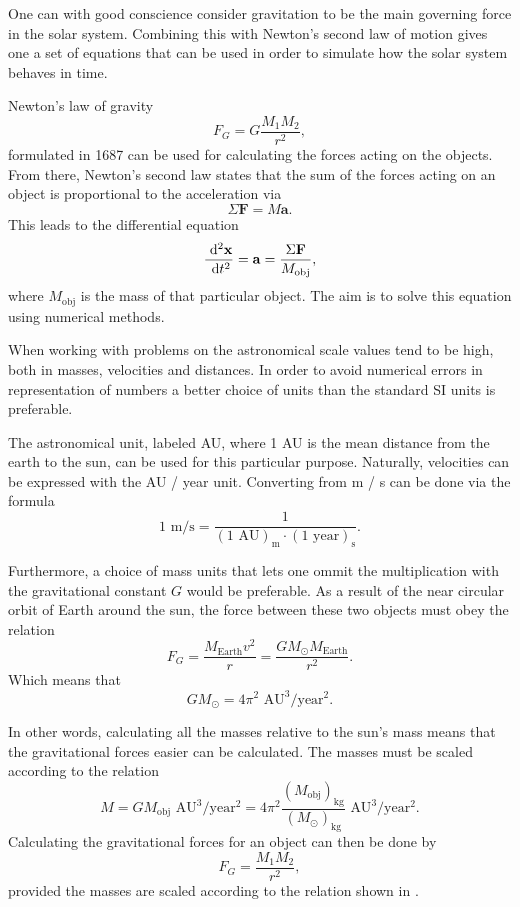 One can with good conscience consider gravitation to be the main
governing force in the solar system. Combining this with Newton's
second law of motion gives one a set of equations that can be used
in order to simulate how the solar system behaves in time.

Newton's law of gravity \[ F_G = G\frac{M_1 M_2}{r^2}, \]
formulated in 1687 can be used for calculating the forces acting on
the objects. From there, Newton's second law states that the sum of
the forces acting on an object is proportional to the acceleration
via \[ \Sigma \mathbf{F} = M \mathbf{a}. \] This leads to the
differential equation \[ \frac{\ \mathrm{d}^2 \mathbf{x}}{\ \mathrm{d}t^2} =
\mathbf{a} = \frac{\Sigma \mathbf{F}}{M_{\text{obj}}}, \] where
$M_{\text{obj}}$ is the mass of that particular object. The aim is
to solve this equation using numerical methods.

When working with problems on the astronomical scale values tend to
be high, both in masses, velocities and distances. In order to
avoid numerical errors in representation of numbers a better choice
of units than the standard SI units is preferable.

The astronomical unit, labeled AU, where 1 AU is the mean distance
from the earth to the sun, can be used for this particular purpose.
Naturally, velocities can be expressed with the AU / year unit.
Converting from m / s can be done via the formula \[1 \text{ m/s} =
\frac{1}{(1 \text{ AU})_{\text{m}} \cdot (1 \text{ year})_{\text{s}}}. \]

Furthermore, a choice of mass units that lets one ommit the
multiplication with the gravitational constant $G$ would be
preferable. As a result of the near circular orbit of Earth around
the sun, the force between these two objects must obey the relation
\[ F_G = \frac{M_{\text{Earth}}v^2}{r} = \frac{G M_{\odot}
M_{\text{Earth}}}{r^2}. \] Which means that \[G M_{\odot} = 4\pi^2
\text{ AU}^3 / \text{year}^2. \]

In other words, calculating all the masses relative to the sun's
mass means that the gravitational forces easier can be calculated.
The masses must be scaled according to the relation
\begin{equation} 
    \label{eq:scaleMass}
    M = G M_{\text{obj}} \text{ AU}^3 / \text{year}^2 = 4\pi^2
    \frac{(M_{\text{obj}})_{\text{kg}}}{(M_{\odot})_{\text{kg}}}
    \text{ AU}^3 / \text{year}^2.
\end{equation}
Calculating the gravitational forces for an object can then be done
by \[ F_G = \frac{M_1 M_2}{r^2}, \] provided the masses are scaled
according to the relation shown in .

